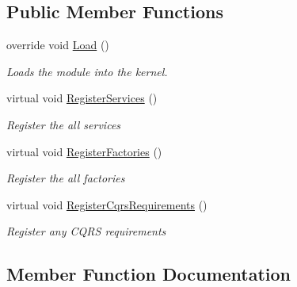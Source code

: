\subsection*{Public Member Functions}
\begin{DoxyCompactItemize}
\item 
override void \hyperlink{classCqrs_1_1Ninject_1_1MongoDB_1_1Configuration_1_1MongoDbDataStoreModule_a29425d24f414443a98a59dad09dcadfc_a29425d24f414443a98a59dad09dcadfc}{Load} ()
\begin{DoxyCompactList}\small\item\em Loads the module into the kernel. \end{DoxyCompactList}\item 
virtual void \hyperlink{classCqrs_1_1Ninject_1_1MongoDB_1_1Configuration_1_1MongoDbDataStoreModule_a4500dc7d8760b2cb9ac70fa90acc7ac9_a4500dc7d8760b2cb9ac70fa90acc7ac9}{Register\+Services} ()
\begin{DoxyCompactList}\small\item\em Register the all services \end{DoxyCompactList}\item 
virtual void \hyperlink{classCqrs_1_1Ninject_1_1MongoDB_1_1Configuration_1_1MongoDbDataStoreModule_a8b2ad4e3919423212f0e23614fda4473_a8b2ad4e3919423212f0e23614fda4473}{Register\+Factories} ()
\begin{DoxyCompactList}\small\item\em Register the all factories \end{DoxyCompactList}\item 
virtual void \hyperlink{classCqrs_1_1Ninject_1_1MongoDB_1_1Configuration_1_1MongoDbDataStoreModule_ad1630c7f82d9a0a452682e855277280d_ad1630c7f82d9a0a452682e855277280d}{Register\+Cqrs\+Requirements} ()
\begin{DoxyCompactList}\small\item\em Register any C\+Q\+RS requirements \end{DoxyCompactList}\end{DoxyCompactItemize}


\subsection{Member Function Documentation}
\mbox{\label{classCqrs_1_1Ninject_1_1MongoDB_1_1Configuration_1_1MongoDbDataStoreModule_a29425d24f414443a98a59dad09dcadfc_a29425d24f414443a98a59dad09dcadfc}} 
